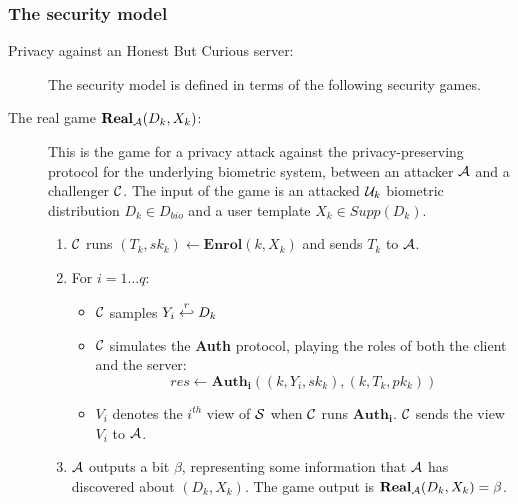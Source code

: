 \subsubsection{The security model}
\begin{description}
\item[Privacy against an Honest But Curious server:] The security model is defined in terms of the following security games.

\item[The real game $\mathbf{Real}_{\mathcal{A}}(D_k,X_k)$:] This is the game for a privacy attack against the
  privacy-preserving protocol for the underlying biometric system, between an attacker $\mathcal{A}$ and a challenger
  $\mathcal{C}$. The input of the game is an attacked $\mathcal{U}_k$ biometric distribution $D_k \in D_{bio}$ and a user
  template $X_k \in Supp(D_k)$.
  \begin{enumerate} %
  \item $\mathcal{C}$ runs $(T_k, sk_k) \gets \mathbf{Enrol}(k,X_k)$ and sends $T_k$ to $\mathcal{A}$.
  \item For $i = 1 \dots q$:
    \begin{itemize}
    \item $\mathcal{C}$ samples \(Y_{i} \stackrel{r}{\hookleftarrow} D_{k}\)
    \item $\mathcal{C}$ simulates the \textbf{Auth} protocol, playing the roles of both the client and the server:
      \[
        res \gets \mathbf{Auth_i}((k, Y_i, sk_k), (k, T_k, pk_k))
      \]
    \item $V_i$ denotes the $i^{th}$ view of $\mathcal{S}$ when $\mathcal{C}$ runs $\mathbf{Auth_i}$. $\mathcal{C}$
      sends the view $V_i$ to $\mathcal{A}$.
    \end{itemize}
  \item $\mathcal{A}$ outputs a bit $\beta$, representing some information that $\mathcal{A}$ has discovered about
    $(D_k,X_k)$. The game output is $\mathbf{Real}_{\mathcal{A}}(D_k,X_k) = \beta$.
  \end{enumerate}


\end{description}
